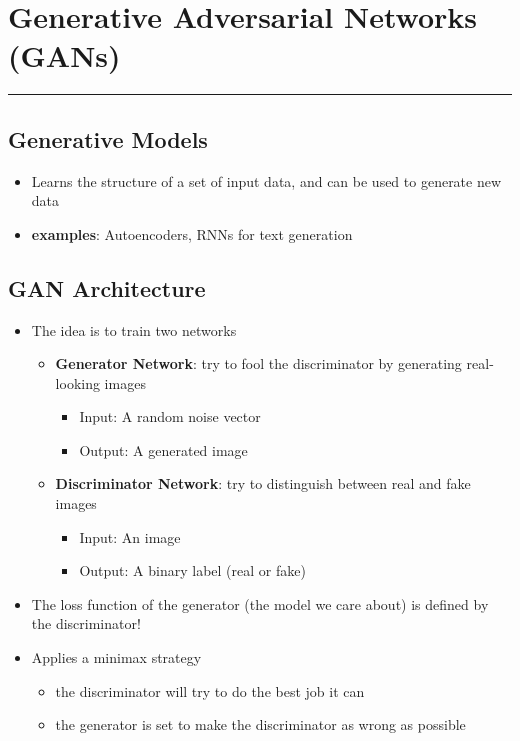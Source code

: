 \documentclass[11pt]{article}
\begin{document}
\pagebreak

\section{Generative Adversarial Networks (GANs)}
\hrule \vspace{15pt}

\subsection{Generative Models}
\begin{itemize}
\item Learns the structure of a set of input data, and can be used to generate new data
\item \textbf{examples}: Autoencoders, RNNs for text generation
\end{itemize}

\subsection{GAN Architecture}
\begin{itemize}
\item The idea is to train two networks
\begin{itemize}
\item \textbf{Generator Network}: try to fool the discriminator by generating real-looking images
\begin{itemize}
\item Input: A random noise vector
\item Output: A generated image
\end{itemize}
\item \textbf{Discriminator Network}: try to distinguish between real and fake images
\begin{itemize}
\item Input: An image
\item Output: A binary label (real or fake)
\end{itemize}
\end{itemize}
\item The loss function of the generator (the model we care about) is defined by the discriminator! 
\item Applies a minimax strategy
\begin{itemize}
\item the discriminator will try to do the best job it can
\item the generator is set to make the discriminator as wrong as possible
\end{itemize}
\end{itemize}
\end{document}
